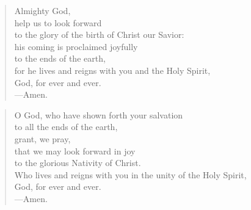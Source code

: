 \prayer

\setlength{\vleftmargin}{\prayerleftmargini}

\begin{verse}
Almighty God,\\
help us to look forward\\
to the glory of the birth of Christ our Savior:\\
his coming is proclaimed joyfully\\
to the ends of the earth,\\
for he lives and reigns with you and the Holy Spirit,\\
God, for ever and ever. \\
{\color{red}---\thinspace}Amen.
\end{verse}


\begin{verse}
O God, who have shown forth your salvation\\
to all the ends of the earth,\\
grant, we pray,\\
that we may look forward in joy\\
to the glorious Nativity of Christ.\\
Who lives and reigns with you in the unity of the Holy Spirit,\\
God, for ever and ever. \\
{\color{red}---\thinspace}Amen.
\end{verse}

\setlength{\vleftmargin}{\defleftmargini}